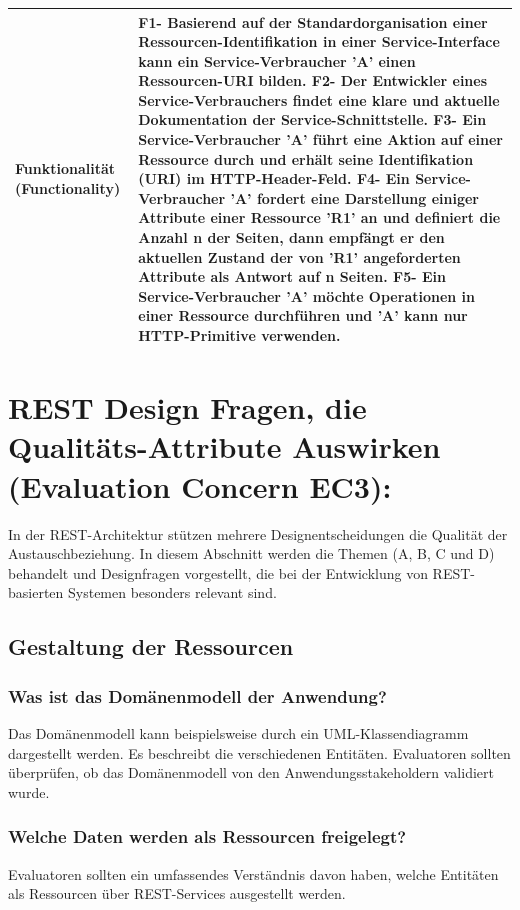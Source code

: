 \documentclass{acmsiggraph}
\begin{document}
\begin{center}
\begin{xtabular}{|C{2cm}|L{6cm}|}
     Funktionalität  (Functionality) & 
    \textbf{F1}- Basierend auf der Standardorganisation einer Ressourcen-Identifikation in einer Service-Interface kann ein Service-Verbraucher 'A' einen Ressourcen-URI bilden.\newline
\textbf{F2}- Der Entwickler eines Service-Verbrauchers findet eine klare und aktuelle Dokumentation der Service-Schnittstelle.\newline
\textbf{F3}- Ein Service-Verbraucher 'A' führt eine Aktion auf einer Ressource durch und erhält seine Identifikation (URI) im HTTP-Header-Feld.\newline
\textbf{F4}- Ein Service-Verbraucher 'A' fordert eine Darstellung einiger Attribute einer Ressource 'R1' an und definiert die Anzahl n der Seiten, dann empfängt er den aktuellen Zustand der von 'R1' angeforderten Attribute als Antwort auf n Seiten.\newline
\textbf{F5}- Ein Service-Verbraucher 'A' möchte Operationen in einer Ressource durchführen und 'A' kann nur HTTP-Primitive verwenden.
\\    
\hline
 \end{xtabular}
 \end{center}




\section{REST Design Fragen, die Qualitäts-Attribute Auswirken (Evaluation Concern EC3):}

In der REST-Architektur stützen mehrere Designentscheidungen die Qualität der Austauschbeziehung. In diesem Abschnitt werden die Themen (A, B, C und D) behandelt und Designfragen vorgestellt, die bei der Entwicklung von REST-basierten Systemen besonders relevant sind.

\subsection{Gestaltung der Ressourcen}
\subsubsection{Was ist das Domänenmodell der Anwendung?}
Das Domänenmodell kann beispielsweise durch ein UML-Klassendiagramm dargestellt werden. Es beschreibt die verschiedenen Entitäten. Evaluatoren sollten überprüfen, ob das Domänenmodell von den Anwendungsstakeholdern validiert wurde.
\subsubsection{Welche Daten werden als Ressourcen freigelegt?}
Evaluatoren sollten ein umfassendes Verständnis davon haben, welche Entitäten als Ressourcen über REST-Services ausgestellt werden.
\end{document}
